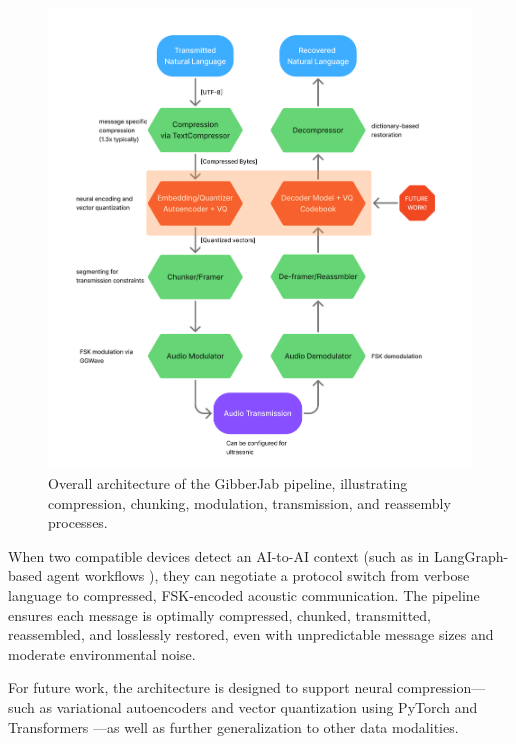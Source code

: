 \documentclass[12pt,openany]{article}
\theoremstyle{definition}
\theoremstyle{definition}
\theoremstyle{definition}
\begin{document}
\bigskip
\vspace{0.2em}

\begin{figure}[H]
    \centering
    \includegraphics[width=.92\linewidth]{GibberJab Flow.png}
    \caption{Overall architecture of the GibberJab pipeline, illustrating compression, chunking, modulation, transmission, and reassembly processes.}
    \label{fig:enter-label}
\end{figure}



When two compatible devices detect an AI-to-AI context (such as in LangGraph-based agent workflows \cite{langgraph}), they can negotiate a protocol switch from verbose language to compressed, FSK-encoded acoustic communication. The pipeline ensures each message is optimally compressed, chunked, transmitted, reassembled, and losslessly restored, even with unpredictable message sizes and moderate environmental noise.

For future work, the architecture is designed to support neural compression—such as variational autoencoders and vector quantization using PyTorch \cite{paszke2019pytorch} and Transformers \cite{wolf2020transformers}—as well as further generalization to other data modalities.

\clearpage
\end{document}
